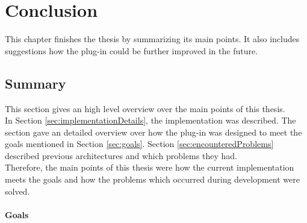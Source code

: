 
\chapter{Conclusion}
\label{chap:conclusion}

This chapter finishes the thesis by summarizing its main points. It also includes suggestions how the plug-in could be further improved in the future.

\section{Summary}
\label{sec:summary}

This section gives an high level overview over the main points of this thesis. \\
In Section \ref{sec:implementationDetails}, the implementation was described. The section gave an detailed overview over how the plug-in was designed to meet the goals mentioned in Section \ref{sec:goals}. Section \ref{sec:encounteredProblems} described previous architectures and which problems they had.\\
Therefore, the main points of this thesis were how the current implementation meets the goals and how the problems which occurred during development were solved.

\subsubsection{Goals}

